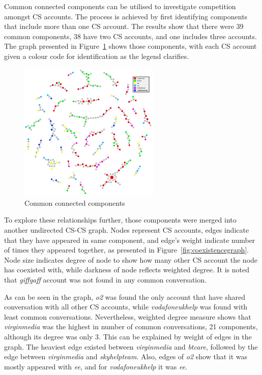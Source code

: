 \documentclass[sigconf]{acmart}
\begin{document}
Common connected components can be utilised to investigate competition
amongst CS accounts. The process is achieved by first identifying
components that include more than one CS account. The results show
that there were 39 common components, 38 have two CS accounts, and one
includes three accounts. The graph presented in
Figure~\ref{fig:commoncc} shows those components, with each CS account
given a colour code for identification as the legend clarifies.

\begin{figure}[htb]
\centering
\includegraphics[width=0.6\textwidth]{images/commoncc.png}
\caption{Common connected components}
\label{fig:commoncc}
\end{figure}

To explore these relationships further, those components were merged
into another undirected CS-CS graph. Nodes represent CS accounts,
edges indicate that they have appeared in same component, and edge's
weight indicate number of times they appeared together, as presented
in Figure~\ref{fig:coexistencegraph}. Node size indicates degree of
node to show how many other CS account the node has coexisted with,
while darkness of node reflects weighted degree. It is noted that
{\emph{giffgaff}} account was not found in any common conversation.

As can be seen in the graph, {\emph{o2}} was found the only account
that have shared conversation with all other CS accounts, while
{\emph{vodafoneukhelp}} was found with least common
conversations. Nevertheless, weighted degree measure shows that
{\emph{virginmedia}} was the highest in number of common
conversations, 21 components, although its degree was only 3. This can
be explained by weight of edges in the graph. The heaviest edge
existed between {\emph{virginmedia}} and {\emph{btcare}}, followed by
the edge between {\emph{virginmedia}} and {\emph{skyhelpteam}}. Also,
edges of {\emph{o2}} show that it was mostly appeared with
{\emph{ee}}, and for {\emph{vodafoneukhelp}} it was {\emph{ee}}.
\end{document}
